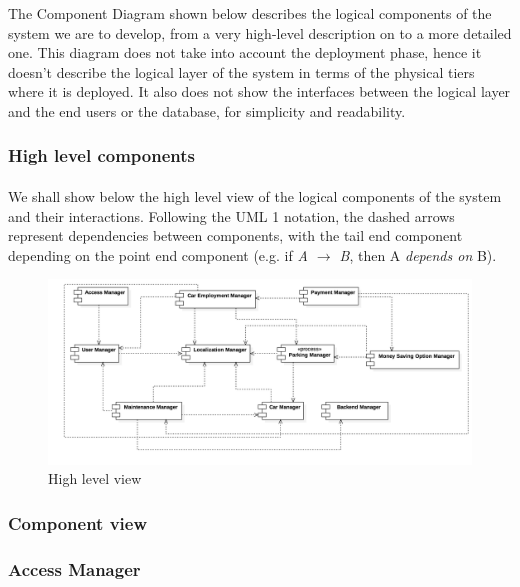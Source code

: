 The Component Diagram shown below describes the logical components of the system we are to develop, from a very high-level description on to a more detailed one. This diagram does not take into account the deployment phase, hence it doesn't describe the logical layer of the system in terms of the physical tiers where it is deployed. It also does not show the interfaces between the logical layer and the end users or the database, for simplicity and readability. 


	\subsubsection{High level components}
		\paragraph{} We shall show below the high level view of the logical components of the system and their interactions. Following the UML 1 notation, the dashed arrows represent dependencies between components, with the tail end component depending on the point end component (e.g. if \textit{A $\rightarrow$ B}, then A \textit{depends on} B). 

		
		\begin{figure}[h]
			\includegraphics[scale=0.26, center]{img/component_diagrams/01_high_level_component_view.png}
			\caption{High level view}
		\end{figure}
\FloatBarrier


	\subsubsection{Component view}
	
	\subsubsection*{Access Manager}
		
